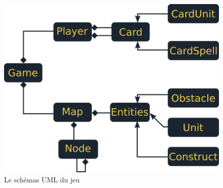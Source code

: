 \documentclass[a4paper,11pt]{report}
\begin{document}
    \begin{figure}[th]
      \begin{center}
        \includegraphics[scale=0.4]{Assets/UML.png}
        \caption{Le schémas UML du jeu}
        \label{fig5}
      \end{center}
    \end{figure}
    
\end{document}
